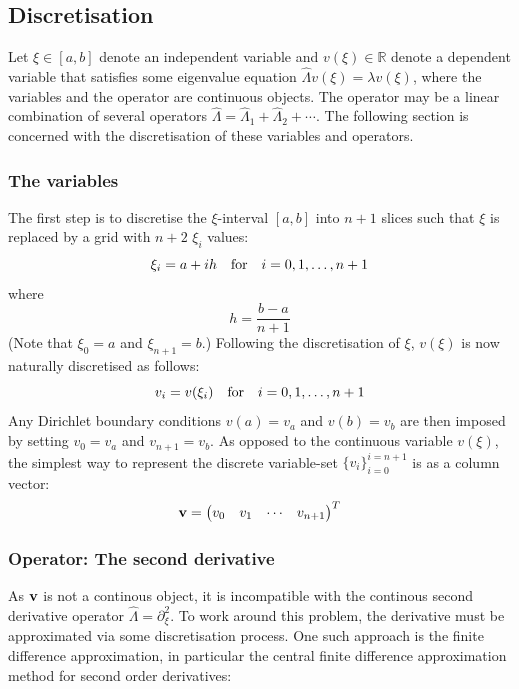 \documentclass[reprint,english]{revtex4-1}
\begin{document}
\subsection{Discretisation}\label{sec:discretisation}
Let \(\xi\in[a,b]\) denote an independent variable and \(v(\xi)\in\mathbb{R}\) denote a dependent variable that satisfies some eigenvalue equation \(\hat{\Lambda} v(\xi)=\lambda v(\xi)\), where the variables and the operator are continuous objects. The operator may be a linear combination of several operators \(\hat{\Lambda}=\hat{\Lambda}_1+\hat{\Lambda}_2+\cdots\). The following section is concerned with the discretisation of these variables and operators.
\subsubsection{The variables}
The first step is to discretise the \(\xi\)-interval \([a,b]\) into \(n+1\) slices such that \(\xi\) is replaced by a grid with \(n+2\) \(\xi_i\) values:
\begin{equation}
\xi_i=a+ih\qfor i=0,1,\ldots,n+1
\end{equation}
where
\begin{equation}
h=\frac{b-a}{n+1}
\end{equation}
(Note that \(\xi_0=a\) and \(\xi_{n+1}=b\).) Following the discretisation of \(\xi\), \(v(\xi)\) is now naturally discretised as follows:
\begin{equation}
v_i=v(\xi_i)\qfor i=0,1,\ldots,n+1
\end{equation}
Any Dirichlet boundary conditions \(v(a)=v_a\) and \(v(b)=v_b\) are then imposed by setting \(v_0=v_a\) and \(v_{n+1}=v_b\). As opposed to the continuous variable \(v(\xi)\), the simplest way to represent the discrete variable-set \(\{v_i\}_{i=0}^{i=n+1}\) is as a column vector:
\begin{equation}
\vb{v}=\mqty(v_0&v_1&\cdots&v_{n+1})^T
\end{equation}
\subsubsection{Operator: The second derivative}
As \(\vb{v}\) is not a continous object, it is incompatible with the continous second derivative operator \(\hat{\Lambda}=\partial_\xi^2\). To work around this problem, the derivative must be approximated via some discretisation process. One such approach is the finite difference approximation, in particular the central finite difference approximation method for second order derivatives:
\end{document}
